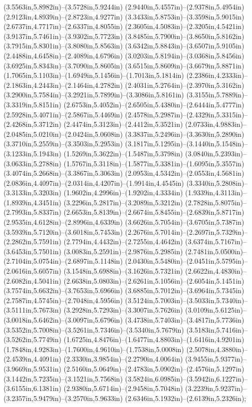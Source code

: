 (3.5563in,5.8982in)--(3.5728in,5.9244in) (2.9440in,5.4557in)--(2.9378in,5.4954in) (2.9123in,4.8939in)--(2.8723in,4.9277in) (3.3433in,5.8753in)--(3.3598in,5.9015in) (2.6737in,4.7717in)--(2.6337in,4.8055in) (2.3605in,4.5083in)--(2.3205in,4.5421in) (3.9137in,5.7461in)--(3.9302in,5.7723in) (3.8485in,5.7900in)--(3.8650in,5.8162in) (3.7915in,5.8301in)--(3.8080in,5.8563in) (3.6342in,5.8843in)--(3.6507in,5.9105in) (2.4488in,4.6458in)--(2.4089in,4.6796in) (3.0203in,5.8194in)--(3.0368in,5.8456in) (3.6925in,5.8343in)--(3.7090in,5.8605in) (3.6515in,5.8609in)--(3.6679in,5.8871in) (1.7065in,5.1103in)--(1.6949in,5.1456in)--(1.7013in,5.1814in) (2.2386in,4.2333in)--(2.1863in,4.2443in)--(2.1464in,4.2782in) (2.4031in,5.2764in)--(2.3970in,5.3162in) (3.2900in,5.7584in)--(3.2921in,5.7899in)--(3.3086in,5.8161in) (3.3155in,5.7889in)--(3.3319in,5.8151in) (2.6753in,5.4052in)--(2.6505in,5.4380in)--(2.6444in,5.4777in) (2.5928in,5.4071in)--(2.5867in,5.4469in) (2.4578in,5.2987in)--(2.4329in,5.3315in)--(2.4268in,5.3712in) (2.4474in,5.3123in)--(2.4412in,5.3521in) (2.0733in,4.9883in)--(2.0485in,5.0210in)--(2.0424in,5.0608in) (3.3837in,5.2496in)--(3.3630in,5.2890in) (3.3710in,5.2559in)--(3.3503in,5.2953in) (3.1817in,5.1295in)--(3.1440in,5.1548in)--(3.1233in,5.1943in) (1.5269in,5.3622in)--(1.5487in,5.3798in) (3.0840in,5.2393in)--(3.0633in,5.2788in) (1.5767in,5.3118in)--(1.5877in,5.3381in)--(1.6095in,5.3557in) (3.4074in,5.2668in)--(3.3867in,5.3063in) (2.0953in,4.5342in)--(2.0553in,4.5681in) (2.0836in,4.4097in)--(2.0314in,4.4207in)--(1.9914in,4.4545in) (3.3340in,5.2808in)--(3.3133in,5.3203in) (1.9602in,4.2996in)--(1.9202in,4.3334in) (1.9339in,4.3113in)--(1.8939in,4.3451in) (3.2296in,5.2817in)--(3.2089in,5.3212in) (2.7828in,5.8075in)--(2.7993in,5.8337in) (2.6653in,5.8139in)--(2.6674in,5.8455in)--(2.6839in,5.8717in) (2.9535in,4.6128in)--(2.8996in,4.6339in) (3.6626in,5.7054in)--(3.6705in,5.7387in) (3.5939in,5.7120in)--(3.6018in,5.7453in) (2.2676in,5.7014in)--(2.2697in,5.7329in)--(2.2862in,5.7591in) (2.7794in,4.4432in)--(2.7255in,4.4642in) (3.6374in,5.7167in)--(3.6453in,5.7501in) (3.0083in,5.2591in)--(2.9876in,5.2985in) (2.7481in,5.0500in)--(2.7104in,5.0754in)--(2.6897in,5.1148in) (2.0430in,5.5480in)--(2.0451in,5.5795in)--(2.0616in,5.6057in) (3.1548in,5.6988in)--(3.1626in,5.7321in) (2.6622in,4.4830in)--(2.6082in,4.5041in) (2.6638in,5.0803in)--(2.6261in,5.1056in)--(2.6054in,5.1451in) (3.7574in,5.6632in)--(3.7653in,5.6966in) (3.6885in,5.7012in)--(3.6964in,5.7345in) (2.7587in,4.5745in)--(2.7048in,4.5956in) (3.5124in,5.7003in)--(3.5033in,5.7340in)--(3.5111in,5.7673in) (3.2928in,5.7293in)--(3.3007in,5.7626in) (3.0109in,5.6125in)--(3.0018in,5.6462in)--(3.0097in,5.6796in) (3.4738in,5.7403in)--(3.4817in,5.7736in) (3.5352in,5.7008in)--(3.5261in,5.7346in)--(3.5340in,5.7679in) (3.5183in,5.7416in)--(3.5262in,5.7749in) (1.6725in,4.8476in)--(1.6477in,4.8803in)--(1.6416in,4.9201in) (1.7848in,4.9283in)--(1.7600in,4.9610in)--(1.7538in,5.0008in) (2.5078in,4.3880in)--(2.4539in,4.4091in) (2.3330in,3.9854in)--(2.2790in,4.0064in) (3.9455in,5.9377in)--(3.9669in,5.9531in) (2.5160in,5.0649in)--(2.4783in,5.0902in)--(2.4576in,5.1297in) (3.1442in,5.7235in)--(3.1521in,5.7568in) (3.5824in,6.0985in)--(3.5942in,6.1227in)--(3.6155in,6.1381in) (2.9380in,5.6714in)--(2.9458in,5.7048in) (3.2239in,5.9237in)--(3.2357in,5.9479in)--(3.2570in,5.9633in) (2.6346in,5.1932in)--(2.6139in,5.2326in);
